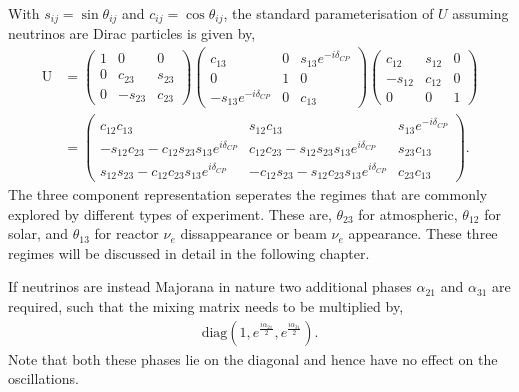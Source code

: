 With $s_{ij}=\sin \theta_{ij}$ and $c_{ij}=\cos \theta_{ij}$, the standard parameterisation of
$U$ assuming neutrinos are Dirac particles is given by,
\begin{align} %
    \mathrm{U} & =
    \begin{pmatrix}
        1 & 0       & 0      \\
        0 & c_{23}  & s_{23} \\
        0 & -s_{23} & c_{23}
    \end{pmatrix}
    \begin{pmatrix}
        c_{13}                   & 0 & s_{13}e^{-i\delta_{CP}} \\
        0                        & 1 & 0                       \\
        -s_{13}e^{-i\delta_{CP}} & 0 & c_{13}
    \end{pmatrix}
    \begin{pmatrix}
        c_{12}  & s_{12} & 0 \\
        -s_{12} & c_{12} & 0 \\
        0       & 0      & 1
    \end{pmatrix}
    \\
               & =
    \begin{pmatrix}
        c_{12}c_{13}
         & s_{12}c_{13}
         & s_{13}e^{-i\delta_{CP}}                          \\
        -s_{12}c_{23}-c_{12}s_{23}s_{13}e^{i\delta_{CP}}
         & c_{12}c_{23}-s_{12}s_{23}s_{13}e^{i\delta_{CP}}
         & s_{23}c_{13}                                     \\
        s_{12}s_{23}-c_{12}c_{23}s_{13}e^{i\delta_{CP}}
         & -c_{12}s_{23}-s_{12}c_{23}s_{13}e^{i\delta_{CP}}
         & c_{23}c_{13}
    \end{pmatrix}.
\end{align} %
The three component representation seperates the regimes that are commonly explored by different
types of experiment. These are, $\theta_{23}$ for atmospheric, $\theta_{12}$ for solar, and
$\theta_{13}$ for reactor $\nu_{e}$ dissappearance or beam $\nu_{e}$ appearance. These three
regimes will be discussed in detail in the following chapter.

If neutrinos are instead Majorana in nature two additional phases $\alpha_{21}$ and $\alpha_{31}$
are required, such that the mixing matrix needs to be multiplied by,
\begin{align} %
    \mathrm{diag}(1, e^{\frac{i\alpha_{21}}{2}}, e^{\frac{i\alpha_{31}}{2}}).
\end{align} %
Note that both these phases lie on the diagonal and hence have no effect on the oscillations.

